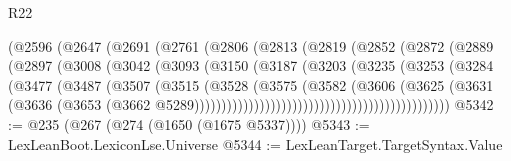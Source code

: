 \begin{lexlean}{R22}
\begin{coremodule}
                                (@2596
                                  (@2647
                                    (@2691
                                      (@2761
                                        (@2806
                                          (@2813
                                            (@2819
                                              (@2852
                                                (@2872
                                                  (@2889
                                                    (@2897
                                                      (@3008
                                                        (@3042
                                                          (@3093
                                                            (@3150
                                                              (@3187
                                                                (@3203
                                                                  (@3235
                                                                    (@3253
                                                                      (@3284
                                                                        (@3477
                                                                          (@3487
                                                                            (@3507
                                                                              (@3515
                                                                                (@3528
                                                                                  (@3575
                                                                                    (@3582
                                                                                      (@3606
                                                                                        (@3625
                                                                                          (@3631
                                                                                            (@3636
                                                                                              (@3653
                                                                                                (@3662
                                                                                                  @5289)))))))))))))))))))))))))))))))))))))))))))))))
@5342 := @235 (@267 (@274 (@1650 (@1675 @5337))))
@5343 := LexLeanBoot.LexiconLse.Universe
@5344 := LexLeanTarget.TargetSyntax.Value

\end{coremodule}
\end{lexlean}
